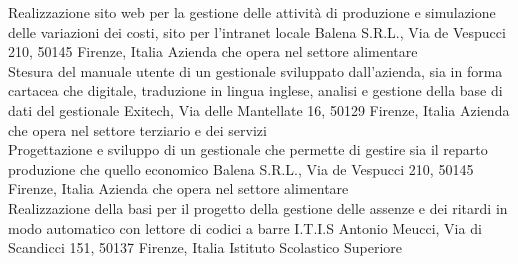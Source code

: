 \documentclass[totpages,openbib,italian]{europecv}
\begin{document}
\begin{europecv}
{Realizzazione sito web per la gestione delle attivit\`a di produzione
  e simulazione delle variazioni dei costi, sito per l'intranet locale}
{Balena S.R.L., Via de Vespucci 210, 50145 Firenze, Italia}
{Azienda che opera nel settore alimentare}
\\
{Stesura del manuale utente di un gestionale sviluppato dall'azienda,
  sia in forma cartacea che digitale, traduzione in lingua inglese,
  analisi e gestione della base di dati del gestionale}
{Exitech, Via delle Mantellate 16, 50129 Firenze, Italia}
{Azienda che opera nel settore terziario e dei servizi}
\\
{Progettazione e sviluppo di un gestionale che permette di gestire sia
  il reparto produzione che quello economico}
{Balena S.R.L., Via de Vespucci 210, 50145 Firenze, Italia}
{Azienda che opera nel settore alimentare}
\\
{Realizzazione della basi per il progetto della gestione delle assenze
  e dei ritardi in modo automatico con lettore di codici a barre}
{I.T.I.S Antonio Meucci, Via di Scandicci 151, 50137 Firenze, Italia}
{Istituto Scolastico Superiore}



\end{europecv}
\end{document}
